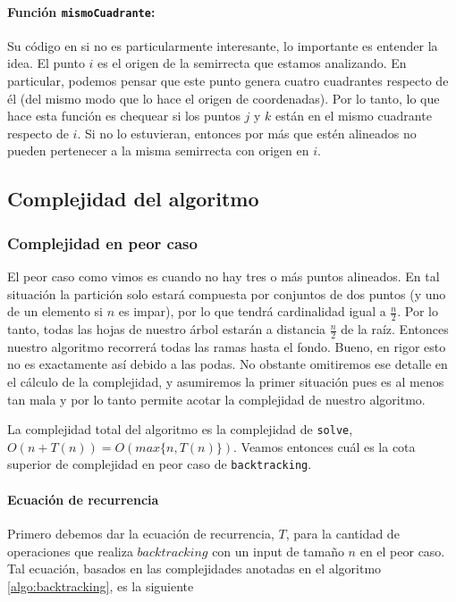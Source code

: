 
  \paragraph{Función \texttt{mismoCuadrante}:} Su código en si no es particularmente interesante, lo importante es entender la idea. El punto $i$ es el origen de la semirrecta que estamos analizando. En particular, podemos pensar que este punto genera cuatro cuadrantes respecto de él (del mismo modo que lo hace el origen de coordenadas). Por lo tanto, lo que hace esta función es chequear si los puntos $j$ y $k$ están en el mismo cuadrante respecto de $i$. Si no lo estuvieran, entonces por más que estén alineados no pueden pertenecer a la misma semirrecta con origen en $i$.

\subsection{Complejidad del algoritmo}
\subsubsection{Complejidad en peor caso}
El peor caso como vimos es cuando no hay tres o más puntos alineados. En tal situación la partición solo estará compuesta por conjuntos de dos puntos (y uno de un elemento si $n$ es impar), por lo que tendrá cardinalidad igual a $\frac{n}{2}$. Por lo tanto, todas las hojas de nuestro árbol estarán a distancia $\frac{n}{2}$ de la raíz. Entonces nuestro algoritmo recorrerá todas las ramas hasta el fondo. Bueno, en rigor esto no es exactamente así debido a las podas. No obstante omitiremos ese detalle en el cálculo de la complejidad, y asumiremos la primer situación pues es al menos tan mala y por lo tanto permite acotar la complejidad de nuestro algoritmo.

La complejidad total del algoritmo es la complejidad de \texttt{solve}, $O(n + T(n)) = O(max\{n, T(n)\})$. Veamos entonces cuál es la cota superior de complejidad en peor caso de \texttt{backtracking}. 

\paragraph{Ecuación de recurrencia}
Primero debemos dar la ecuación de recurrencia, $T$, para la cantidad de operaciones que realiza $backtracking$ con un input de tamaño $n$ en el peor caso. Tal ecuación, basados en las complejidades anotadas en el algoritmo \ref{algo:backtracking}, es la siguiente

